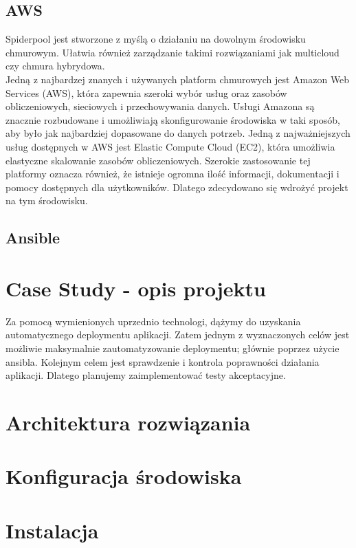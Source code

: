 \documentclass[onecolumn,12pt]{article}
\begin{document}
\subsection{AWS}
Spiderpool jest stworzone z myślą o działaniu na dowolnym środowisku chmurowym. Ułatwia również zarządzanie takimi rozwiązaniami jak multicloud czy chmura hybrydowa.\\
Jedną z najbardzej znanych i używanych platform chmurowych jest Amazon Web Services (AWS), która zapewnia szeroki wybór usług oraz zasobów obliczeniowych, sieciowych i przechowywania danych. Usługi Amazona są znacznie  rozbudowane i umożliwiają skonfigurowanie środowiska w taki sposób, aby było jak najbardziej dopasowane do danych potrzeb. Jedną z najważniejszych usług dostępnych w AWS jest Elastic Compute Cloud (EC2), która umożliwia elastyczne skalowanie zasobów obliczeniowych. Szerokie zastosowanie tej platformy oznacza również, że istnieje ogromna ilość informacji, dokumentacji i pomocy dostępnych dla użytkowników. Dlatego zdecydowano się wdrożyć projekt na tym środowisku.
\subsection{Ansible}

\section{Case Study - opis projektu}
Za pomocą wymienionych uprzednio technologi, dążymy do uzyskania automatycznego deploymentu aplikacji. Zatem jednym z wyznaczonych celów jest możliwie maksymalnie zautomatyzowanie deploymentu; głównie poprzez użycie ansibla. \newline 
Kolejnym celem jest sprawdzenie i kontrola poprawności działania aplikacji. Dlatego planujemy zaimplementować testy akceptacyjne. 

\section{Architektura rozwiązania}


\section{Konfiguracja środowiska}

\section{Instalacja}
\end{document}
